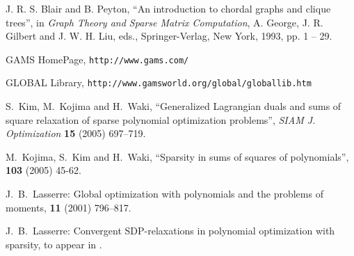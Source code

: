 \begin{thebibliography}{10}

J. R. S. Blair and B. Peyton, 
\newblock ``An introduction to chordal graphs and clique trees'', 
\newblock in {\em Graph Theory and Sparse Matrix Computation}, 
A. George, J. R. Gilbert and J. W. H. Liu, eds., 
Springer-Verlag, New York, 1993, pp. 1 -- 29. 

GAMS HomePage, 
\newblock \verb+http://www.gams.com/+

GLOBAL Library,
\newblock \verb+http://www.gamsworld.org/global/globallib.htm+


 S.~Kim, M.~Kojima and H.~Waki, ``Generalized Lagrangian duals
and sums of square relaxation of sparse polynomial optimization problems'', 
{\em SIAM J. Optimization} {\bf 15} (2005) 697--719.

M.~Kojima, S.~Kim and H.~Waki,
\newblock ``Sparsity in sums of squares of polynomials'', 
 {\bf 103} (2005) 45-62.




J.~B.~Lasserre:
\newblock Global optimization with polynomials and the problems of
        moments, 
  {\bf 11} (2001) 796--817.

J.~B.~Lasserre:
\newblock Convergent SDP-relaxations in polynomial optimization with sparsity, to appear in 
.


\end{thebibliography}
